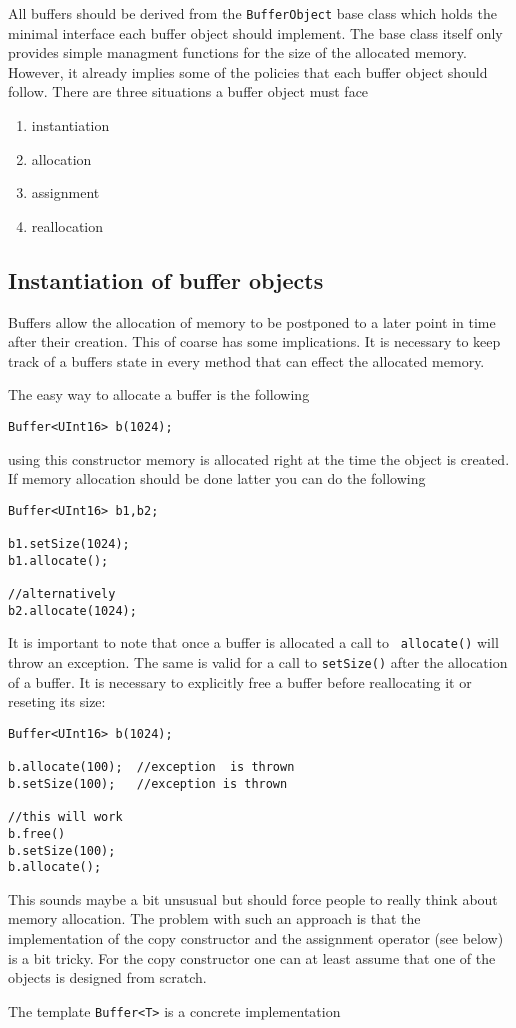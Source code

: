 All buffers should be derived from the {\tt BufferObject} base class which 
holds the minimal interface each buffer object should implement. 
The base class itself only provides simple managment functions for the
size of the allocated memory. However, it already implies some of the 
policies that each buffer object should follow. 
There are three situations a buffer object must face
\begin{enumerate}
  \item instantiation
  \item allocation
  \item assignment
  \item reallocation
\end{enumerate} 

\subsection{Instantiation of buffer objects}

Buffers allow the allocation of memory to be postponed to a later point in 
time after their creation. This of coarse has some implications. 
It is necessary to keep track of a buffers state in every method that 
can effect the allocated memory. 

The easy way to allocate a buffer is the following
\begin{verbatim}
Buffer<UInt16> b(1024);
\end{verbatim}
using this constructor memory is allocated right at the time the object is 
created. 
If memory allocation should be done latter you can do the following
\begin{verbatim}
Buffer<UInt16> b1,b2;

b1.setSize(1024);
b1.allocate();

//alternatively
b2.allocate(1024);
\end{verbatim}
It is important to note that once a buffer is allocated a call to {\tt
allocate()} will throw an exception. The same is valid for a call to 
{\tt setSize()} after the allocation of a buffer. 
It is necessary to explicitly free a buffer before reallocating it 
or reseting its size:
\begin{verbatim}
Buffer<UInt16> b(1024);

b.allocate(100);  //exception  is thrown
b.setSize(100);   //exception is thrown

//this will work
b.free()
b.setSize(100);
b.allocate();
\end{verbatim}
This sounds maybe a bit unsusual but should force people to really think 
about memory allocation. 
The problem with such an approach is that the implementation of the 
copy constructor and the assignment operator (see below) is a bit tricky. 
For the copy constructor one can at least assume that one of the objects
is designed from scratch. 




The template {\tt Buffer<T>} is a concrete implementation 
